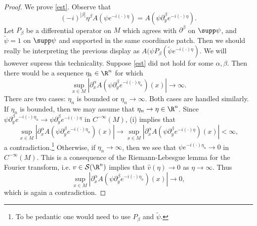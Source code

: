\documentclass[12pt]{article}
\begin{document}
\begin{proof}
We prove \eqref{est}. Observe that
\[(-i)^{|\beta|}\eta^\beta A(\psi e^{-i(\cdot)\eta}) = A(\psi \partial^{\beta}_y e^{-i(\cdot)\eta}).\]
Let $P_\beta$ be a differential operator on $M$ which agrees with $\partial^{\beta}$ on $\supp \psi$, and $\tilde{\psi} = 1$ on $\supp \psi$ and supported in the same coordinate patch. Then we should really be interpreting the previous display as
$A(\psi P_\beta(\tilde{\psi}e^{-i(\cdot)\eta})$. We will however supress this technicality. Suppose \eqref{est} did not hold for some $\alpha,\beta$. Then there would be a sequence $\eta_k \in \R^n$ for which
\[\sup_{x \in M}| \partial_x^{\alpha} A(\psi  \partial^{\beta}_ye^{-i(\cdot)\eta_n})(x)| \to \infty.\]
There are two cases: $\eta_n$ is bounded or $\eta_n \to \infty$. Both cases are handled similarly. If $\eta_n$ is bounded, then we may assume that $\eta_n \to \eta \in \R^n$. Since $\psi\partial^{\beta}_ye^{-i(\cdot)\eta_n} \to \psi\partial^{\beta}_ye^{-i(\cdot)\eta}$ in $C^{-\infty}(M)$, (i) implies that 
\[\sup_{x \in M}| \partial_x^{\alpha} A(\psi  \partial^{\beta}_ye^{-i(\cdot)\eta_n})(x)| \to \sup_{x \in M}| \partial_x^{\alpha} A(\psi  \partial^{\beta}_ye^{-i(\cdot)\eta})(x)| < \infty,\]
a contradiction.\footnote{To be pedantic one would need to use $P_\beta$ and $\tilde{\psi}$.} Otherwise, if $\eta_n \to \infty$, then we see that $\psi e^{-i(\cdot)\eta_n} \to 0$ in $C^{-\infty}(M)$. This is a consequence of the Riemann-Lebesgue lemma for the Fourier transform, i.e. $v \in \mathcal S(\R^n)$ implies that $\hat{v}(\eta) \to 0$ as $\eta \to \infty$. Thus
\[\sup_{x \in M}| \partial_x^{\alpha} A(\psi  \partial^{\beta}_ye^{-i(\cdot)\eta_n})(x)| \to 0,\]
which is again a contradiction.
 

\end{proof}
\end{document}
